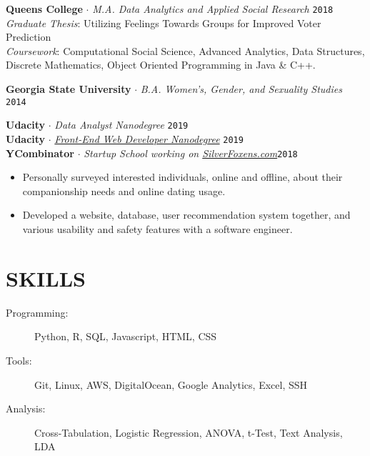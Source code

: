 \documentclass[margin, line, 11pt]{res}
\begin{document}
\begin{resume}
{\bf Queens College} $\cdot$ {\it M.A. Data Analytics and Applied Social Research} \hfill \texttt{2018}
\\{\it Graduate Thesis}: Utilizing Feelings Towards Groups for Improved Voter Prediction
\\{\it Coursework}: Computational Social Science, Advanced Analytics, Data Structures, Discrete 
Mathematics, Object Oriented Programming in Java \& C++.

{\bf Georgia State University} $\cdot$ {\it B.A. Women's, Gender, and Sexuality Studies} \hfill \texttt{2014}

{\bf Udacity} $\cdot$ {\it Data Analyst Nanodegree} \hfill \texttt{2019}
\\ {\bf Udacity} $\cdot$ {\it \href{https://confirm.udacity.com/VUHFGNF6}{Front-End Web Developer Nanodegree}} \hfill \texttt{2019}
\\ {\bf YCombinator} $\cdot$ {\it Startup School working on \href{http://silverfoxens.com}{SilverFoxens.com}}\hfill \texttt{2018}
\begin{itemize}
 \item Personally surveyed interested individuals, online and offline, about their companionship needs and online dating usage.
 \item Developed a website, database, user recommendation system together, and various usability and safety features with a software engineer.
\end{itemize}

\section{SKILLS}

\begin{description}
\item[Programming:] Python, R, SQL, Javascript, HTML, CSS
\item[Tools:] Git, Linux, AWS, DigitalOcean, Google Analytics, Excel, SSH
\item[Analysis:] Cross-Tabulation, Logistic Regression, ANOVA, t-Test, Text Analysis, LDA
\end{description}

\end{resume}
\end{document}
